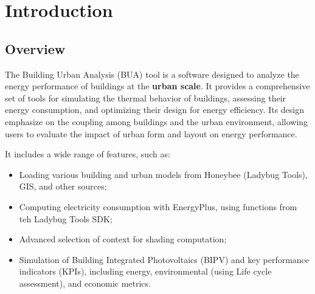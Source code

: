 \documentclass[a4paper,12pt]{article} %
\begin{document}
    \newpage

\printglossary[title=Glossary, toctitle=Glossary,style = long, nonumberlist,nopostdot]


\newpage

\section{Introduction}
\label{sec:introduction}

    \subsection{Overview}
    \label{subsec:overview}
    The Building Urban Analysis (BUA) tool is a software designed to analyze the energy performance of buildings at the \textbf{urban scale}.
    It provides a comprehensive set of tools for simulating the thermal behavior of buildings, assessing their energy consumption, and optimizing their design for energy efficiency.
    Its design emphasize on the coupling among buildings and the urban environment, allowing users to evaluate the impact of urban form and layout on energy performance.

    \smallbreak
    It includes a wide range of features, such as:
    \begin{itemize}
        \item Loading various building and urban models from Honeybee (Ladybug Tools), GIS, and other sources;
        \item Computing electricity consumption with EnergyPlus, using functions from teh Ladybug Tools SDK;
        \item Advanced selection of context for shading computation;
        \item Simulation of Building Integrated Photovoltaics (BIPV) and key performance indicators (KPIs), including energy, environmental (using Life cycle assessment), and economic metrics.
    \end{itemize}
\end{document}
